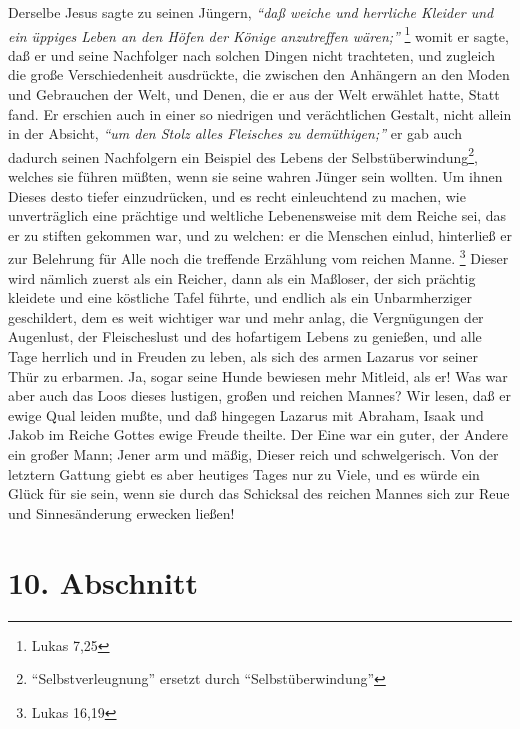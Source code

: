 Derselbe Jesus sagte
zu seinen Jüngern, 
\textit{"`daß weiche und herrliche Kleider und ein üppiges Leben an
den Höfen der Könige anzutreffen wären;"'}
\footnote{Lukas 7,25} 
womit er sagte,
daß er und seine Nachfolger nach solchen Dingen nicht trachteten, und zugleich
die große Verschiedenheit ausdrückte, die zwischen den Anhängern an den Moden
und Gebrauchen der Welt, und Denen, die er aus der Welt erwählet hatte, Statt
fand. Er erschien auch in einer so niedrigen und verächtlichen Gestalt, nicht
allein in der Absicht, 
\textit{"`um den Stolz alles Fleisches zu demüthigen;"'} er gab
auch dadurch seinen Nachfolgern ein Beispiel des Lebens der Selbstüberwindung\footnote{"`Selbstverleugnung"' ersetzt durch "`Selbstüberwindung"'},
welches sie führen müßten, wenn sie seine wahren Jünger sein wollten. Um ihnen
Dieses desto tiefer einzudrücken, und es recht einleuchtend zu machen, wie
unverträglich eine prächtige und weltliche Lebenensweise mit dem Reiche sei, das
er zu stiften gekommen war, und zu welchen: er die Menschen einlud, hinterließ
er zur Belehrung für Alle noch die treffende Erzählung vom reichen
Manne.
\footnote{Lukas 16,19} 
Dieser wird nämlich zuerst als ein Reicher, dann als
ein Maßloser, der sich prächtig kleidete und eine köstliche Tafel führte, und
endlich als ein Unbarmherziger geschildert, dem es weit wichtiger war und mehr
anlag, die Vergnügungen der Augenlust, der Fleischeslust und des hofartigem
Lebens zu genießen, und alle Tage herrlich und in Freuden zu leben, als sich des
armen Lazarus vor seiner Thür zu erbarmen. Ja, sogar seine Hunde bewiesen mehr
Mitleid, als er! Was war aber auch das Loos dieses lustigen, großen und reichen
Mannes? Wir lesen, daß er ewige Qual leiden mußte, und daß hingegen Lazarus mit
Abraham, Isaak und Jakob im Reiche Gottes ewige Freude theilte. Der Eine war ein
guter, der Andere ein großer Mann; Jener arm und mäßig, Dieser reich und
schwelgerisch. Von der letztern Gattung giebt es aber heutiges Tages nur zu
Viele, und es würde ein Glück für sie sein, wenn sie durch das Schicksal des
reichen Mannes sich zur Reue und Sinnesänderung erwecken ließen!

\section{10. Abschnitt} \label{kap14_ab10}


